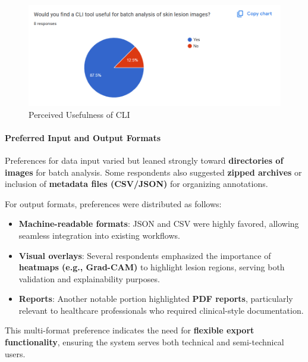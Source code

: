 \documentclass[
  12pt,
  oneside]{article}
\providecommand{\tightlist}{%
  \setlength{\itemsep}{0pt}\setlength{\parskip}{0pt}}
\begin{document}
\begin{figure}

{\centering \includegraphics[width=1\linewidth]{technical-user-chart4} 

}

\caption{Perceived Usefulness of CLI}\label{fig:unnamed-chunk-12}
\end{figure}

\paragraph{Preferred Input and Output
Formats}\label{preferred-input-and-output-formats}

Preferences for data input varied but leaned strongly toward
\textbf{directories of images} for batch analysis. Some respondents also
suggested \textbf{zipped archives} or inclusion of \textbf{metadata
files (CSV/JSON)} for organizing annotations.

For output formats, preferences were distributed as follows:

\begin{itemize}
\tightlist
\item
  \textbf{Machine-readable formats}: JSON and CSV were highly favored,
  allowing seamless integration into existing workflows.
\item
  \textbf{Visual overlays}: Several respondents emphasized the
  importance of \textbf{heatmaps (e.g., Grad-CAM)} to highlight lesion
  regions, serving both validation and explainability purposes.
\item
  \textbf{Reports}: Another notable portion highlighted \textbf{PDF
  reports}, particularly relevant to healthcare professionals who
  required clinical-style documentation.
\end{itemize}

This multi-format preference indicates the need for \textbf{flexible
export functionality}, ensuring the system serves both technical and
semi-technical users.
\end{document}
